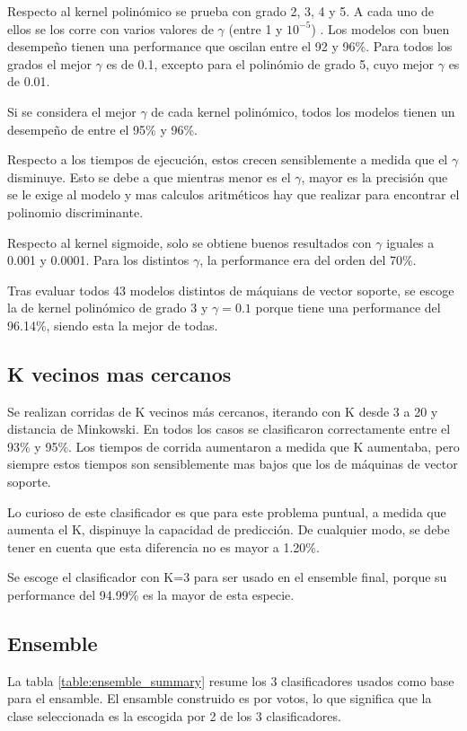 \documentclass[journal]{IEEEtran}
\begin{document}
Respecto al kernel polinómico se prueba con grado 2, 3, 4 y 5. A cada
uno de ellos se los corre con varios valores de $\gamma$ (entre 1 y $10^{-5}$) . Los modelos
con buen desempeño tienen una performance que oscilan entre el 92 y
96\%. Para todos los grados el mejor $\gamma$ es de 0.1, excepto para el polinómio
de grado 5, cuyo mejor $\gamma$ es de 0.01. 

Si se considera el mejor $\gamma$ de cada kernel polinómico, todos los modelos tienen un
desempeño de entre el 95\% y 96\%.

Respecto a los tiempos de ejecución, estos crecen sensiblemente a medida que el $\gamma$ 
disminuye. Esto se debe a que mientras menor es el $\gamma$, mayor es la precisión que 
se le exige al modelo y mas calculos aritméticos hay que realizar para encontrar
el polinomio discriminante. 

Respecto al kernel sigmoide, solo se obtiene buenos resultados con $\gamma$ iguales
a 0.001 y 0.0001. Para los distintos $\gamma$, la performance era del orden del
70\%.

Tras evaluar todos 43 modelos distintos de máquians de vector soporte, se escoge
la de kernel polinómico de grado 3 y $\gamma=0.1$ porque tiene una performance del
96.14\%, siendo esta la mejor de todas.

\subsection{K vecinos mas cercanos}
Se realizan corridas de K vecinos más cercanos, iterando con K desde
3 a 20 y distancia de Minkowski. En todos los casos se clasificaron
correctamente entre el 93\% y 95\%. Los tiempos de corrida aumentaron
a medida que K aumentaba, pero siempre estos tiempos son sensiblemente
mas bajos que los de máquinas de vector soporte.

Lo curioso de este clasificador es que para este problema puntual, a medida
que aumenta el K, dispinuye la capacidad de predicción. De cualquier modo,
se debe tener en cuenta que esta diferencia no es mayor a 1.20\%.

Se escoge el clasificador con K=3 para ser usado en el ensemble final,
porque su performance del 94.99\% es la mayor de esta especie.

\subsection{Ensemble}
La tabla \ref{table:ensemble_summary} resume los 3 clasificadores usados 
como base para el ensamble. El ensamble construido es por votos, lo que
significa que la clase seleccionada es la escogida por 2 de los
3 clasificadores.
\end{document}
